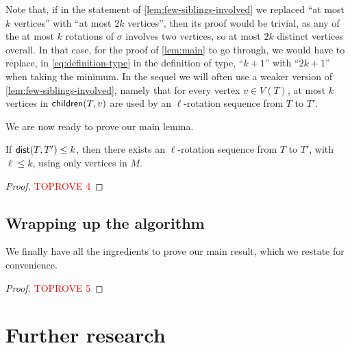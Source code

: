 \documentclass[a4paper,UKenglish,cleveref, autoref, thm-restate]{lipics-v2021}
\newcommand{\child}{{\sf children}\xspace}
\newcommand{\dist}{{\sf dist}\xspace}
\begin{document}
Note that, if in the statement of \autoref{lem:few-siblings-involved} we replaced ``at most $k$ vertices'' with ``at most $2k$ vertices'', then its proof would be trivial, as any of the at most $k$ rotations of $\sigma$ involves two vertices, so at most $2k$ distinct vertices overall. In that case, for the proof of \autoref{lem:main} to go through,  we would have to replace, in \autoref{eq:definition-type} in the definition of type, ``$k+1$'' with ``$2k+1$'' when taking the minimum. In the sequel we will often use a weaker version of \autoref{lem:few-siblings-involved}, namely that for every vertex $v \in V(T)$, at most $k$ vertices in $\child(T,v)$ are used by an $\ell$-rotation sequence from $T$ to $T'$.



We are now ready to prove our main lemma.

\begin{lemma}\label{lem:main}
If $\dist(T,T')\leq k$, then there exists an $\ell$-rotation sequence from $T$ to $T'$, with $\ell \leq k$, using only vertices in $M$.
\end{lemma}
\begin{proof}\textcolor{red}{TOPROVE 4}\end{proof}






















\subsection{Wrapping up the algorithm}
\label{sec:wrapping-up}

We finally have all the ingredients to prove our main result, which we restate for convenience.

\maintheorem*

\begin{proof}\textcolor{red}{TOPROVE 5}\end{proof}












\section{Further research}
\label{sec:discussion}
\end{document}
